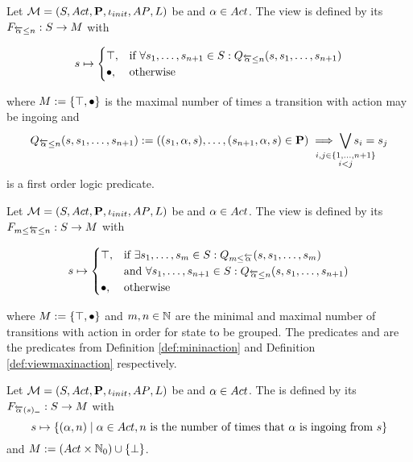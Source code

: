 \documentclass[preview]{standalone}
\begin{document}
\begin{definition}
	Let $\chgph = \chgphtuple$ be \achgphN and $\action \in \actions$. The view \viewmaxinaction is defined by its \grpfctN $\gfctmaxinaction : \states \to \arbset$ with
	
	\[
	\state \mapsto
	\begin{cases}
			\group,				& \text{if } \forall \state_1, \dots, \state_{\numinact+1} \in \states: \predmaxinact \\
			\remelem,          	& \text{otherwise}
		\end{cases}
	\]
	
	where $\imggrp := \imggrpbinview$
	 is the maximal number of times a transition with action \action may be ingoing and 
	\[
	\predmaxinact := ((\state_1, \action, \state), \dots, (\state_{\numinact+1}, \action, \state) \in \trans) \implies \bigvee_{\mathclap{\substack{i,j \in \{1,\dots, \numinact+1\} \\ i < j}}} \state_i = \state_j
	\]
	is a first order logic predicate.
\end{definition}

\begin{definition}
	Let $\chgph = \chgphtuple$ be \achgphN and $\action \in \actions$. The view 
	\viewspaninaction is defined by its \grpfctN $\gfctspaninaction : \states \to \arbset$ with
	
	\[
	\state \mapsto
	\begin{cases}
			\group,				& \text{if } \exists \state_1, \dots, \state_\numinactb \in \states: \predmininact[\numinactb] \\ &\text{and } \forall \state_1, \dots, \state_{\numinact+1} \in \states: \predmaxinact \\
			\remelem,          	& \text{otherwise}
		\end{cases}
	\]
	
	where $\imggrp := \imggrpbinview$
	and $\numinactb, \numinact \in \natnums$ are the minimal and maximal number of transitions with action \action in order for state to be grouped. The predicates \predmininact and \predmaxinact are the predicates from Definition \ref{def:mininaction} and Definition \ref{def:viewmaxinaction} respectively.
\end{definition}

\begin{definition}
	Let $\chgph = \chgphtuple$ be \achgphN and $\action \in \actions$. The \viewN \viewstronginactident is defined by its \grpfctN $\gfctstronginactident : \states \to \imggrp$ with
	\[
	\state \mapsto	
	\{(\action, \numinact) \mid \action \in \actions, \numinact \text{ is the number of times that \action is ingoing from } \state\}
	\]
	and $\imggrp := (\actions \times \natnums_0) \cup \remset$.
\end{definition}
\end{document}
